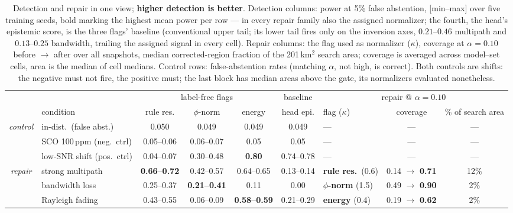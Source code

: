 \documentclass{article}
\begin{document}
\begin{table}[t]
\caption{Detection and repair in one view; \textbf{higher detection is
better}. Detection columns: power at 5\% false abstention, [min--max]
over five training seeds, bold marking the highest mean power per row ---
in every repair family also the assigned normalizer; the fourth, the
head's epistemic score, is the three flags' baseline (conventional
upper tail; its lower tail fires only on the inversion axes,
$0.21$--$0.46$ multipath and $0.13$--$0.25$ bandwidth, trailing the
assigned signal in every cell). Repair columns: the flag used as normalizer
($\kappa$), coverage at $\alpha=0.10$ before $\to$ after over all snapshots,
median corrected-region fraction of the 201\,km$^2$ search area; coverage
is averaged across model--set cells, area is the median of cell medians. Control
rows: false-abstention rates (matching $\alpha$, not high, is
correct). Both controls are shifts: the negative must not fire, the
positive must; the last block has median areas above the gate, its
normalizers evaluated nonetheless.}
\label{tab:detect}
\centering
\setlength{\tabcolsep}{3.5pt}
\renewcommand{\arraystretch}{0.85}
\begin{tabular}{@{}clcccc|lcc@{}}
\toprule
 & & \multicolumn{3}{c}{label-free flags} & baseline
 & \multicolumn{3}{c}{repair @ $\alpha=0.10$} \\
\cmidrule(lr){3-5}\cmidrule(lr){6-6}\cmidrule(lr){7-9}
 & condition & rule res. & $\phi$-norm & energy & head epi.
          & flag ($\kappa$) & coverage & \% of search area \\
\midrule
{\itshape control} & in-dist.\ (false abst.)       & 0.050 & 0.049 & 0.049 & 0.049 & --- & --- & --- \\
& SCO 100\,ppm (neg.\ ctrl)     & 0.05--0.06 & 0.06--0.07 & 0.05 & 0.05 & --- & --- & --- \\
& low-SNR shift (pos.\ ctrl)    & 0.04--0.07 & 0.30--0.48 & \textbf{0.80} & 0.74--0.78 & --- & --- & --- \\
\midrule
{\itshape repair} & strong multipath              & \textbf{0.66--0.72} & 0.42--0.57 & 0.64--0.65 & 0.13--0.14 & \textbf{rule res.}\ (0.6) & 0.14 $\to$ \textbf{0.71} & 12\% \\
& bandwidth loss               & 0.25--0.37 & \textbf{0.21--0.41} & 0.11 & 0.00 & \textbf{$\phi$-norm} (1.5) & 0.49 $\to$ \textbf{0.90} & 2\% \\
& Rayleigh fading               & 0.43--0.55 & 0.06--0.09 & \textbf{0.58--0.59} & 0.21--0.29 & \textbf{energy} (0.4) & 0.19 $\to$ \textbf{0.62} & 2\% \\

\end{tabular}
\end{table}
\end{document}
